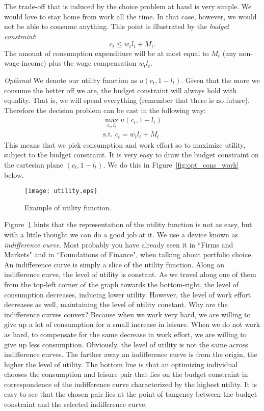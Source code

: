 \documentclass[letterpaper,12pt]{article}
\begin{document}
The trade-off that is induced by the choice problem at hand is very simple. We would love to stay
home from work all the time. In that case, however, we would not be able to consume anything. This
point is illustrated by the \textit{budget constraint}:
%
\begin{equation*}
c_{t}\leq w_{t}l_{t}+M_{t}.
\end{equation*}
%
The amount of consumption expenditure will be at most equal to
$M_{t}$ (any non-wage income) plus the wage compensation
$w_{t}l_{t}$.

\textit{Optional} \footnotesize We denote our utility function as
$u(c_{t},1-l_{t})$. Given that the more we consume the better off
we are, the budget constraint will always hold with equality. That
is, we will spend everything (remember that there is no future).
Therefore the decision problem can be cast in the following way:
%
\begin{align*}
\max_{c_{t},l_{t}} u(c_{t},1-l_{t})\\
\text{s.t. } c_{t}=w_{t}l_{t}+M_{t}
\end{align*}
%
This means that we pick consumption and work effort so to maximize
utility, subject to the budget constraint. It is very easy to draw
the budget constraint on the cartesian plane $(c_{t},1-l_{t})$. We
do this in Figure~\ref{fig:opt_cons_work} below.

\begin{figure}[h!]
\centering
\texttt{[image: utility.eps]}\newline
\caption{Example of utility function.} \label{fig:utility}
\end{figure}

Figure~\ref{fig:utility} hints that the representation of the
utility function is not as easy, but with a little thought we can
do a good job at it. We use a device known as \textit{indifference
curve}. Most probably you have already seen it in ``Firms and
Markets" and in ``Foundations of Finance", when talking about
portfolio choice. An indifference curve is simply a slice of the
utility function. Along an indifference curve, the level of
utility is constant. As we travel along one of them from the
top-left corner of the graph towards the bottom-right, the level
of consumption decreases, inducing lower utility. However, the
level of work effort decreases as well, maintaining the level of
utility constant. Why are the indifference curves convex? Because
when we work very hard, we are willing to give up a lot of
consumption for a small increase in leisure. When we do not work
as hard, to compensate for the same decrease in work effort, we
are willing to give up less consumption. Obviously, the level of
utility is not the same across indifference curves. The farther
away an indifference curve is from the origin, the higher the
level of utility. The bottom line is that an optimizing individual
chooses the consumption and leisure pair that lies on the budget
constraint in correspondence of the indifference curve
characterized by the highest utility. It is easy to see that the
chosen pair lies at the point of tangency between the budget
constraint and the selected indifference curve.
\end{document}
